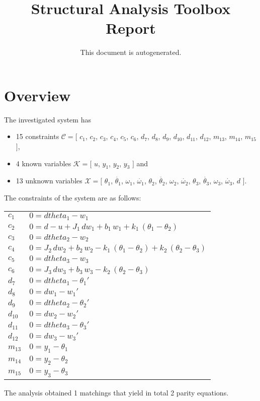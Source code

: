 \documentclass[a4,11pt]{article}
\title{Structural Analysis Toolbox Report}
\author{This document is autogenerated.}
\begin{document}
\maketitle
\section{Overview}
The investigated system has
\begin{itemize}
	\item 15 constraints $\mathcal{C} = [$ $c_1$, $c_2$, $c_3$, $c_4$, $c_5$, $c_6$, $d_7$, $d_8$, $d_9$, $d_10$, $d_11$, $d_12$, $m_13$, $m_14$, $m_15$ $]$,
	\item 4 known variables $\mathcal{K} = [$ $u$, $y_1$, $y_2$, $y_3$ $]$ and
	\item 13 unknown variables $\mathcal{X} = [$ $\theta_1$, $\dot{\theta_1}$, $\omega_1$, $\dot{\omega_1}$, $\theta_2$, $\dot{\theta_2}$, $\omega_2$, $\dot{\omega_2}$, $\theta_3$, $\dot{\theta_3}$, $\omega_3$, $\dot{\omega_3}$, $d$ $]$.
\end{itemize}
The constraints of the system are as follows:
\begin{longtable}{ l | p{} }
	$c_1$ & $ 0=dtheta_{1}-w_{1} $ \\
	$c_2$ & $ 0=d-u+J_{1}\,dw_{1}+b_{1}\,w_{1}+k_{1}\,\left(\theta _{1}-\theta _{2}\right) $ \\
	$c_3$ & $ 0=dtheta_{2}-w_{2} $ \\
	$c_4$ & $ 0=J_{2}\,dw_{2}+b_{2}\,w_{2}-k_{1}\,\left(\theta _{1}-\theta _{2}\right)+k_{2}\,\left(\theta _{2}-\theta _{3}\right) $ \\
	$c_5$ & $ 0=dtheta_{3}-w_{3} $ \\
	$c_6$ & $ 0=J_{3}\,dw_{3}+b_{3}\,w_{3}-k_{2}\,\left(\theta _{2}-\theta _{3}\right) $ \\
	$d_7$ & $ 0=dtheta_{1}-\theta _{1}' $ \\
	$d_8$ & $ 0=dw_{1}-w_{1}' $ \\
	$d_9$ & $ 0=dtheta_{2}-\theta _{2}' $ \\
	$d_10$ & $ 0=dw_{2}-w_{2}' $ \\
	$d_11$ & $ 0=dtheta_{3}-\theta _{3}' $ \\
	$d_12$ & $ 0=dw_{3}-w_{3}' $ \\
	$m_13$ & $ 0=y_{1}-\theta _{1} $ \\
	$m_14$ & $ 0=y_{2}-\theta _{2} $ \\
	$m_15$ & $ 0=y_{3}-\theta _{3} $ \\
\end{longtable}
The analysis obtained 1 matchings that yield in total 2 parity equations.\newpage
\end{document}
